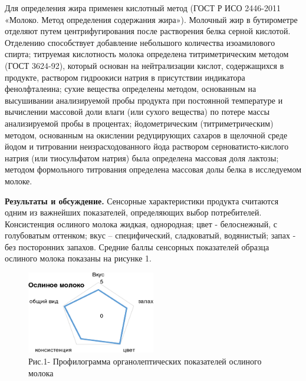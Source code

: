 \begin{multicols}{2}
Для определения жира применен кислотный метод (ГОСТ Р ИСО 2446-2011
«Молоко. Метод определения содержания жира»). Молочный жир в бутирометре
отделяют путем центрифугирования после растворения белка серной
кислотой. Отделению способствует добавление небольшого количества
изоамилового спирта; титруемая кислотность молока определена
титриметрическим методом (ГОСТ 3624-92), который основан на
нейтрализации кислот, содержащихся в продукте, раствором гидроокиси
натрия в присутствии индикатора фенолфталеина; сухие вещества определены
методом, основанным на высушивании анализируемой пробы продукта при
постоянной температуре и вычислении массовой доли влаги (или сухого
вещества) по потере массы анализируемой пробы в процентах;
йодометрическим (титриметрическим) методом, основанным на окислении
редуцирующих сахаров в щелочной среде йодом и титровании
неизрасходованного йода раствором серноватисто-кислого натрия (или
тиосульфатом натрия) была определена массовая доля лактозы; методом
формольного титрования определена массовая долы белка в исследуемом
молоке.

{\bfseries Результаты и обсуждение.} Сенсорные характеристики продукта
считаются одним из важнейших показателей, определяющих выбор
потребителей. Консистенция ослиного молока жидкая, однородная; цвет -
белоснежный, с голубоватым оттенком; вкус -- специфический, сладковатый,
водянистый; запах - без посторонних запахов. Средние баллы сенсорных
показателей образца ослиного молока показаны на рисунке 1.
\end{multicols}

\begin{figure}[H]
	\centering
	\includegraphics[width=0.5\textwidth]{assets/1106}
	\caption*{Рис.1- Профилограмма органолептических показателей ослиного молока}
\end{figure}


